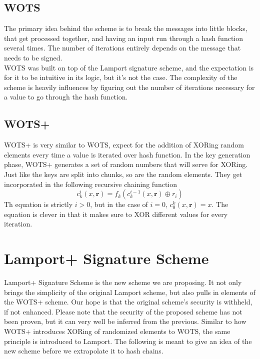 \documentclass[]{scrartcl}
\begin{document}
\subsection*{WOTS}
The primary idea behind the scheme is to break the messages into little blocks, that get processed together, and having an input run through a hash function several times. The number of iterations entirely depends on the message that needs to be signed.\\
WOTS was built on top of the Lamport signature scheme, and the expectation is for it to be intuitive in its logic, but it's not the case. The complexity of the scheme is heavily influences by figuring out the number of iterations necessary for a value to go through the hash function.

\subsection*{WOTS+}
WOTS+ is very similar to WOTS, expect for the addition of XORing random elements every time a value is iterated over hash function. In the key generation phase, WOTS+ generates a set of random numbers that will serve for XORing. Just like the keys are split into chunks, so are the random elements. They get incorporated in the following recursive chaining function
\begin{equation}
c_{k}^{i}(x,\textbf{r}) = f_{k}(c_{k}^{i-1}(x,\textbf{r}) \oplus r_{i})
\end{equation}
Th equation is strictly $i > 0$, but in the case of $i = 0$, $c_{0}^{k}(x,\textbf{r}) = x$. The equation is clever in that it makes sure to XOR different values for every iteration. 

\section*{Lamport+ Signature Scheme}
Lamport+ Signature Scheme is the new scheme we are proposing. It not only brings the simplicity of the original Lamport scheme, but also pulls in elements of the WOTS+ scheme. Our hope is that the original scheme's security is withheld, if not enhanced. Please note that the security of the proposed scheme has not been proven, but it can very well be inferred from the previous. Similar to how WOTS+ introduces XORing of randomized elements to WOTS, the same principle is introduced to Lamport. The following is meant to give an idea of the new scheme before we extrapolate it to hash chains.\\ \\
\end{document}
